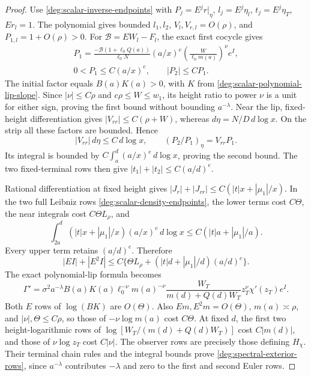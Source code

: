 \begin{proof}
Use \eqref{deg:scalar-inverse-endpoints} with
\(P_j=E^jr|_\eta\), \(l_j=E^j\eta_l\), \(t_j=E^j\eta_T\),
\(Er_l=1\). The polynomial gives bounded \(l_1,l_2\),
\(V_l,V_{r,l}=O(\rho)\), and \(P_{1,l}=1+O(\rho)>0\).
For \(\mathscr B=EW_l-F_l\), the exact first cocycle gives
\begin{equation}\label{deg:spectral-exterior-inverse-decay}
 \begin{gathered}
 P_1=\frac{-\mathscr B(1+\ell_0Q(a))}{\ell_0N}
       (a/x)^e\left(\frac W{\ell_0m(a)}\right)^\nu e^I,\\
 0<P_1\le C(a/x)^e,\qquad |P_2|\le CP_1 .
 \end{gathered}
\end{equation}
The initial factor equals \(B(a)K(a)>0\), with \(K\) from
\eqref{deg:scalar-polynomial-lip-slope}. Since \(|\nu|\le C\rho\)
and \(c\rho\le W\le w_1\), its height ratio to power \(\nu\) is a
unit for either sign, proving the first bound without bounding
\(a^{-\lambda}\). Near the lip, fixed-height differentiation gives
\(|V_{rr}|\le C(\rho+W)\), whereas \(d\eta=N/D\,d\log x\).
On the strip all these factors are bounded. Hence
\[
 |V_{rr}|\,d\eta\le C\,d\log x,\qquad
 (P_2/P_1)_\eta=V_{rr}P_1.
\]
Its integral is bounded by \(C\int_a^d(a/x)^e\,d\log x\), proving
the second bound. The two fixed-terminal rows then give
\(|t_1|+|t_2|\le C(a/d)^e\).

Rational differentiation at fixed height gives
\(|J_r|+|J_{rr}|\le C(|t|x+|\mu_1|/x)\). In the two full Leibniz
rows \eqref{deg:scalar-density-endpoints}, the lower terms cost
\(C\Theta\), the near integrals cost \(C\Theta L_\rho\), and
\[
 \int_{2a}^d(|t|x+|\mu_1|/x)(a/x)^e\,d\log x
 \le C(|t|a+|\mu_1|/a).
\]
Every upper term retains \((a/d)^e\). Therefore
\begin{equation}\label{deg:spectral-exterior-integral-rows}
 |EI|+|E^2I|
 \le C\{\Theta L_\rho+(|t|d+|\mu_1|/d)(a/d)^e\}.
\end{equation}
The exact polynomial-lip formula becomes
\begin{equation}\label{deg:spectral-exterior-slope}
 \Gamma'=\sigma^2a^{-\lambda}
 B(a)K(a)\ell_0^{-\nu}m(a)^{-\nu}
 \frac{W_T}{m(d)+Q(d)W_T}z_T^\nu\chi'(z_T)e^I .
\end{equation}
Both \(E\) rows of \(\log(BK)\) are \(O(\Theta)\). Also
\(E m,E^2m=O(\Theta)\), \(m(a)\asymp\rho\), and
\(|\nu|,\Theta\le C\rho\), so those of \(-\nu\log m(a)\) cost
\(C\Theta\). At fixed \(d\), the first two height-logarithmic rows
of \(\log[W_T/(m(d)+Q(d)W_T)]\) cost \(C|m(d)|\), and those of
\(\nu\log z_T\) cost \(C|\nu|\). The observer rows are precisely
those defining \(H_\chi\). Their terminal chain rules and the integral
bounds prove \eqref{deg:spectral-exterior-rows}, since
\(a^{-\lambda}\) contributes \(-\lambda\) and zero to the first and
second Euler rows.
\end{proof}
